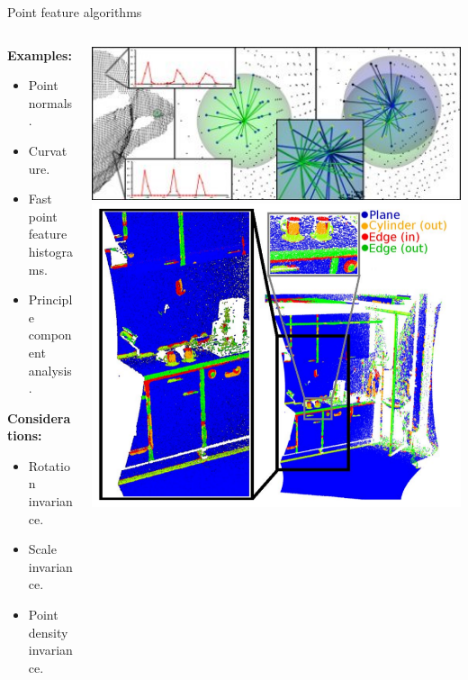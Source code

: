 \documentclass{beamer}
\begin{document}
\begin{frame}{Point feature algorithms}

\begin{columns}[T]
\begin{column}{0.5\textwidth}

\textbf{Examples:}
\begin{itemize}
\item Point normals.
\item Curvature.
\item Fast point feature histograms.
\item Principle component analysis.
\end{itemize}

\textbf{Considerations:}
\begin{itemize}
\item Rotation invariance.
\item Scale invariance.
\item Point density invariance.
\end{itemize}

\end{column}

\begin{column}{0.5\textwidth}

\includegraphics[width=1\textwidth]{pics/features.png}
\includegraphics[width=1\textwidth]{pics/classification.png}

\end{column}

\end{columns}

\end{frame}
\end{document}
